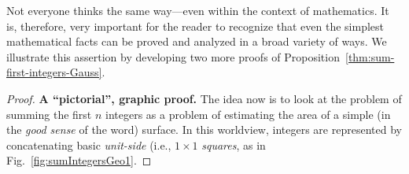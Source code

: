 \medskip

Not everyone thinks the same way---even within the context of
mathematics.  It is, therefore, very important for the reader to
recognize that even the simplest mathematical facts can be proved and
analyzed in a broad variety of ways.  We illustrate this assertion by
developing two more proofs of
Proposition~\ref{thm:sum-first-integers-Gauss}.

\begin{proof}
{\bf A ``pictorial'', graphic proof.}
%
The idea now is to look at the problem of summing the first $n$
integers as a problem of estimating the area of a simple (in the
\textit{good sense} of the word) surface.  In this worldview, integers
are represented by concatenating basic {\it unit-side} (i.e., $1
\times 1$  {\it squares}, as in
Fig.~\ref{fig:sumIntegersGeo1}.


\end{proof}
